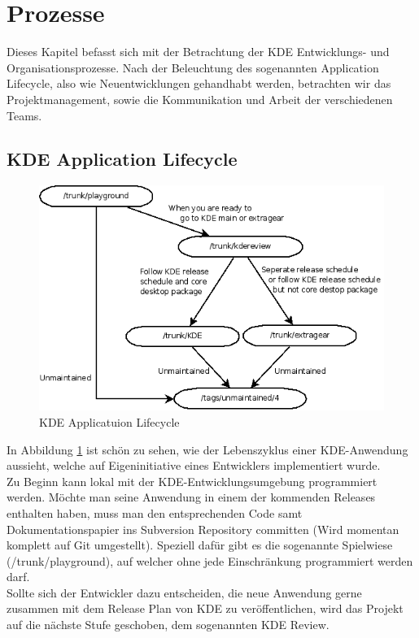 
	
\section{Prozesse}
Dieses Kapitel befasst sich mit der Betrachtung der KDE Entwicklungs- und Organisationsprozesse. Nach der Beleuchtung des sogenannten Application Lifecycle, also wie Neuentwicklungen gehandhabt werden, betrachten wir das Projektmanagement, sowie die Kommunikation und Arbeit der verschiedenen Teams.

\subsection{KDE Application Lifecycle \cite{ApplLife}} 
\begin{figure}[h]
	\centering
	\includegraphics[width=\columnwidth]{images/KDE_application_lifecycle.png}
	\caption{KDE Applicatuion Lifecycle \cite{ApplLife}}
	\label{fig:kde_applLife}
\end{figure}
In Abbildung \ref{fig:kde_applLife} ist schön zu sehen, wie der Lebenszyklus einer KDE-Anwendung aussieht, welche auf Eigeninitiative eines Entwicklers implementiert wurde.\\
Zu Beginn kann lokal mit der KDE-Entwicklungsumgebung programmiert werden. Möchte man seine Anwendung in einem der kommenden Releases enthalten haben, muss man den entsprechenden Code samt Dokumentationspapier ins Subversion Repository committen (Wird momentan komplett auf Git umgestellt). Speziell dafür gibt es die sogenannte Spielwiese (/trunk/playground), auf welcher ohne jede Einschränkung programmiert werden darf.\\
Sollte sich der Entwickler dazu entscheiden, die neue Anwendung gerne zusammen mit dem Release Plan von KDE zu veröffentlichen, wird das Projekt auf die nächste Stufe geschoben, dem sogenannten KDE Review.\\
